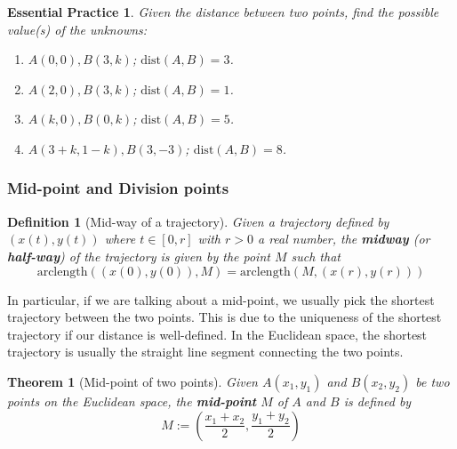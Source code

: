 \documentclass[12pt]{article}
\newtheorem{definition}{Definition}[section]
\newtheorem*{theorem}{Theorem}
\newtheorem{exercise}{Essential Practice}[subsection]
\begin{document}
    \begin{exercise}
        Given the distance between two points, find the possible value(s) of the unknowns:\begin{enumerate}
            \item $A(0,0), B(3,k)$; $\mathrm{dist}(A,B)=3$.
            \item $A(2,0), B(3,k)$; $\mathrm{dist}(A,B)=1$.
            \item $A(k,0), B(0,k)$; $\mathrm{dist}(A,B)=5$.
            \item $A(3+k,1-k), B(3,-3)$; $\mathrm{dist}(A,B)=8$.
        \end{enumerate}
    \end{exercise}

    \subsubsection*{Mid-point and Division points}

    \begin{definition}[Mid-way of a trajectory]
        Given a trajectory defined by $(x(t),y(t))$ where $t\in [0,r]$ with $r>0$ a real number, the \textbf{midway} (or \textbf{half-way}) of the trajectory is given by the point $M$ such that $$\mathrm{arclength}((x(0),y(0)),M)=\mathrm{arclength}(M,(x(r),y(r)))$$
    \end{definition}

    In particular, if we are talking about a mid-point, we usually pick the shortest trajectory between the two points. This is due to the uniqueness of the shortest trajectory if our distance is well-defined. In the Euclidean space, the shortest trajectory is usually the straight line segment connecting the two points.

    \begin{theorem}[Mid-point of two points]
        Given $A(x_1,y_1)$ and $B(x_2,y_2)$ be two points on the Euclidean space, the \textbf{mid-point} $M$ of $A$ and $B$ is defined by $$M:=(\frac{x_1+x_2}{2},\frac{y_1+y_2}{2})$$
    \end{theorem}
\end{document}

